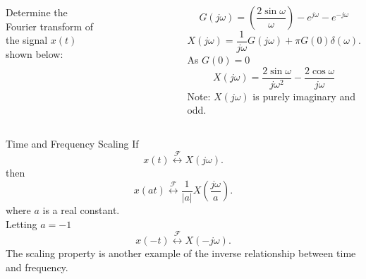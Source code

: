 \begin{frame}[plain]
    \begin{columns}
        \begin{example}
            Determine the Fourier transform of the signal $x(t)$ shown below:
            \begin{figure}
            \centering
                
            \end{figure}
        \end{example}
        \pause

        {
            \begin{figure}
            \centering
                
            \end{figure}
        }
        \pause
        {
            \begin{equation*}
                G(j\omega) = \left(\frac{2\sin \omega}{\omega}\right) - e^{j\omega} - e^{-j\omega}
            \end{equation*}
            \pause
            \begin{equation*}
                X(j\omega) = \frac{1}{ j\omega} G(j\omega) + \pi G(0)\delta(\omega).
            \end{equation*}
            As $G(0) = 0$\\
            \pause
            \begin{equation*}
                X(j\omega) = \frac{2\sin \omega}{ j\omega^2}  - \frac{2\cos \omega}{j\omega}
            \end{equation*}
            Note: $ X(j\omega)$ is purely imaginary and odd.
        }
    \end{columns}
\end{frame}


\begin{frame}{Time and Frequency Scaling}
    If
    \begin{equation*}
        x(t)  \overset{\mathcal{F}}{\longleftrightarrow}  X(j\omega).
    \end{equation*}
    then
    \begin{equation*}
        x(at)  \overset{\mathcal{F}}{\longleftrightarrow}  \frac{1}{|a|}X\left(\frac{j\omega}{a}\right).
    \end{equation*}
    where $a$ is a real constant.\pause \\
    Letting $a = -1$\pause
    \begin{equation*}
        x(-t)  \overset{\mathcal{F}}{\longleftrightarrow}  X(-j\omega).
    \end{equation*}
    The scaling property is another example of the inverse relationship between time and frequency.
\end{frame}



